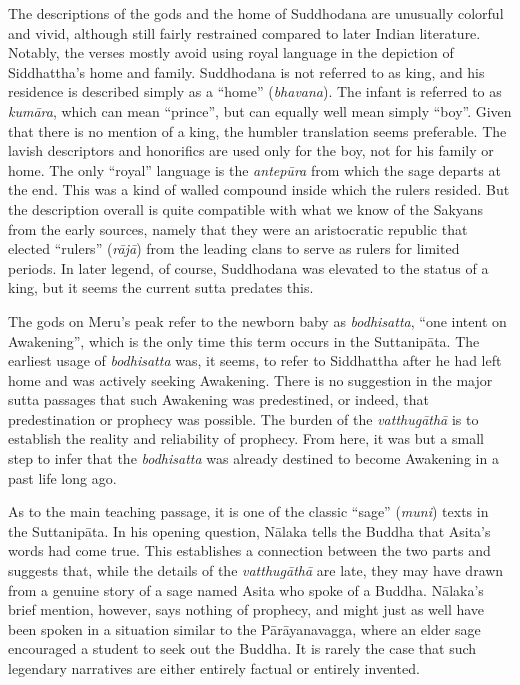 \documentclass[12pt,openany]{book}%
\begin{document}
The descriptions of the gods and the home of Suddhodana are unusually colorful and vivid, although still fairly restrained compared to later Indian literature. Notably, the verses mostly avoid using royal language in the depiction of Siddhattha’s home and family. Suddhodana is not referred to as king, and his residence is described simply as a “home” (\textit{bhavana}). The infant is referred to as \textit{\textsanskrit{kumāra}}, which can mean “prince”, but can equally well mean simply “boy”. Given that there is no mention of a king, the humbler translation seems preferable. The lavish descriptors and honorifics are used only for the boy, not for his family or home. The only “royal” language is the \textit{\textsanskrit{antepūra}} from which the sage departs at the end. This was a kind of walled compound inside which the rulers resided. But the description overall is quite compatible with what we know of the Sakyans from the early sources, namely that they were an aristocratic republic that elected “rulers” (\textit{\textsanskrit{rājā}}) from the leading clans to serve as rulers for limited periods. In later legend, of course, Suddhodana was elevated to the status of a king, but it seems the current sutta predates this.

The gods on Meru’s peak refer to the newborn baby as \textit{bodhisatta}, “one intent on Awakening”, which is the only time this term occurs in the \textsanskrit{Suttanipāta}. The earliest usage of \textit{bodhisatta} was, it seems, to refer to Siddhattha after he had left home and was actively seeking Awakening. There is no suggestion in the major sutta passages that such Awakening was predestined, or indeed, that predestination or prophecy was possible. The burden of the \textit{\textsanskrit{vatthugāthā}} is to establish the reality and reliability of prophecy. From here, it was but a small step to infer that the \textit{bodhisatta} was already destined to become Awakening in a past life long ago.

As to the main teaching passage, it is one of the classic “sage” (\textit{muni}) texts in the \textsanskrit{Suttanipāta}. In his opening question, \textsanskrit{Nālaka} tells the Buddha that Asita’s words had come true. This establishes a connection between the two parts and suggests that, while the details of the \textit{\textsanskrit{vatthugāthā}} are late, they may have drawn from a genuine story of a sage named Asita who spoke of a Buddha. \textsanskrit{Nālaka}’s brief mention, however, says nothing of prophecy, and might just as well have been spoken in a situation similar to the \textsanskrit{Pārāyanavagga}, where an elder sage encouraged a student to seek out the Buddha. It is rarely the case that such legendary narratives are either entirely factual or entirely invented.
\end{document}
